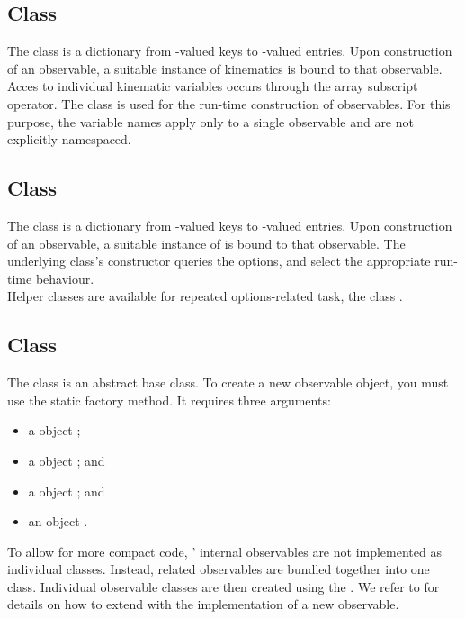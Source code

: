 \subsection{Class }

The class  is a dictionary from -valued keys to
-valued entries. Upon construction of an observable, a suitable instance
of kinematics is bound to that observable. Acces to individual kinematic variables
occurs through the array subscript operator.
The class is used for the run-time construction of observables. For this purpose,
the variable names apply only to a single observable and are not explicitly namespaced.


\subsection{Class }

The class  is a dictionary from -valued keys to
-valued entries. Upon construction of an observable, a suitable instance
of  is bound to that observable. The underlying class's constructor
queries the options, and select the appropriate run-time behaviour.\\

Helper classes are available for repeated options-related task, \eg the class
.


\subsection{Class }

The class  is an abstract base class. To create a new observable object,
you must use the static  factory method. It requires three arguments:
\begin{itemize}
    \item a  object ;
    \item a  object ; and
    \item a  object ; and
    \item an  object .
\end{itemize}

To allow for more compact code, \ctg' internal observables are not implemented as individual
classes. Instead, related observables are bundled together into one class. Individual observable
classes are then created using the . We refer to
 for details on how to extend \ctg with the implementation
of a new observable.\\


